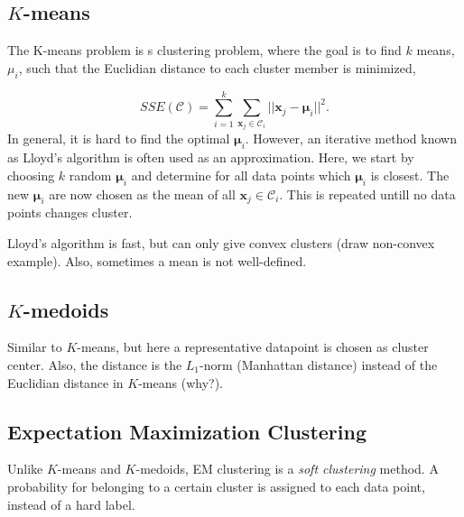 \documentclass[oneside]{memoir}
\renewcommand{\vec}[1]{\ensuremath{\bm{#1}}}
\begin{document}
\subsection{$K$-means}

The K-means problem is s clustering problem, where the goal is to find $k$ means, $\mu_i$, such that the Euclidian distance to each cluster member is minimized,

\begin{equation}
  \label{SSE k means}
SSE(\mathcal{C}) = \sum_{i=1}^k \sum_{\vec{x}_j\in \mathcal{C}_i} ||\vec{x}_j - \vec{\mu}_i||^2. 
\end{equation}
In general, it is hard to find the optimal $\vec{\mu}_i$. However, an iterative method known as Lloyd's algorithm is often used as an approximation. Here, we start by choosing $k$ random $\vec{\mu}_i$ and determine for all data points which $\vec{\mu}_i$ is closest. The new $\vec{\mu}_i$ are now chosen as the mean of all $\vec{x}_j \in \mathcal{C}_i$. This is repeated untill no data points changes cluster.

Lloyd's algorithm is fast, but can only give convex clusters (draw non-convex example). Also, sometimes a mean is not well-defined.

\subsection{$K$-medoids}

Similar to $K$-means, but here a representative datapoint is chosen as cluster center. Also, the distance is the $L_1$-norm (Manhattan distance) instead of the Euclidian distance in $K$-means (why?).

\subsection{Expectation Maximization Clustering}
Unlike $K$-means and $K$-medoids, EM clustering is a \emph{soft clustering} method. A probability for belonging to a certain cluster is assigned to each data point, instead of a hard label.
\end{document}

